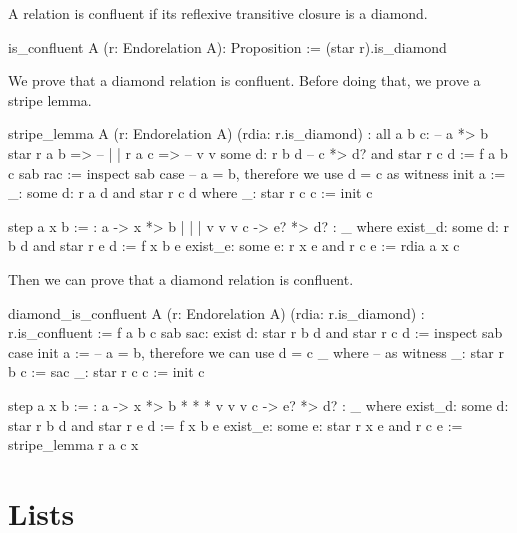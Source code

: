 A relation is confluent if its reflexive transitive closure is a diamond.

\begin{alba}
  is_confluent A (r: Endorelation A): Proposition :=
    (star r).is_diamond
\end{alba}



We prove that a diamond relation is confluent. Before doing that, we prove a
stripe lemma.

\begin{alba}
  stripe_lemma
    A
    (r: Endorelation A)
    (rdia: r.is_diamond)
    : all a b c:                       --  a *> b
        star r a b =>                  --  |    |
        r a c =>                       --  v    v
        some d: r b d                  --  c *> d?
                and
                star r c d :=
     f a b c sab rac :=
       inspect sab case   -- a = b, therefore we use d = c as witness
         init a :=
           _: some d: r a d and star r c d  where
             _: star r c c := init c

         step a x b :=
           {:  a  -> x  *> b
               |     |     |
               v     v     v
               c  -> e? *> d? :}
           _ where
             exist_d: some d: r b d and star r e d := f x b e
             exist_e: some e: r x e and r c e      := rdia a x c
\end{alba}

Then we can prove that a diamond relation is confluent.

\begin{alba}
  diamond_is_confluent
    A
    (r: Endorelation A)
    (rdia: r.is_diamond)
    : r.is_confluent
    :=
      f a b c sab sac: exist d: star r b d and star r c d :=
        inspect sab case
          init a :=            -- a = b, therefore we can use d = c
            _ where            --        as witness
              _: star r b c := sac
              _: star r c c := init c

          step a x b :=
            {:  a  ->  x  *>  b
                *      *      *
                v      v      v
                c  ->  e? *>  d? :}
            _ where
              exist_d: some d: star r b d and star r e d := f x b e
              exist_e: some e: star r x e and r c e := stripe_lemma r a c x

\end{alba}




\newpage
\section{Lists}
\label{sec:certprog-lists}


